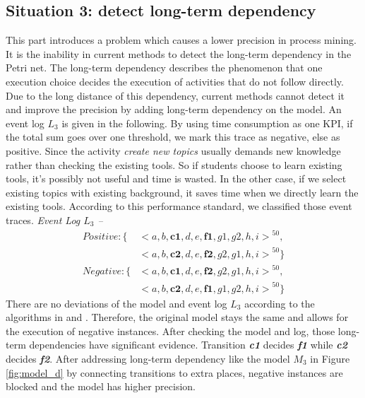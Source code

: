 \subsection{Situation 3: \small{detect long-term dependency}}
This part introduces a problem which causes a lower precision in process mining. It is the inability in current methods to detect the long-term dependency in the Petri net. The long-term dependency describes the phenomenon that one execution choice decides the execution of activities that do not follow directly. Due to the long distance of this dependency, current methods cannot detect it and improve the precision by adding long-term dependency on the model. 
An event log $L_3$ is given in the following. By using time consumption as one KPI, if the total sum goes over one threshold, we mark this trace as negative, else as positive. Since the activity \emph{create new topics} usually demands new knowledge rather than checking the existing tools. So if students choose to learn existing tools, it's possibly not useful and time is wasted. In the other case, if we select existing topics with existing background, it saves time when we directly learn the existing tools. According to this performance standard, we classified those event traces.
\emph{Event Log $L_3$ -- }
\begin{align*}
Positive:\{ & { <a,b,\textbf{c1},d,e,\textbf{f1},g1,g2, h,i>}^{50}, \\   &{<a,b,\textbf{c2},d,e,\textbf{f2},g2,g1, h,i>}^{50} \}  \\
Negative: \{ & {<a,b,\textbf{c1},d,e,\textbf{f2},g2,g1,h,i>}^{50}, \\
& {<a,b,\textbf{c2},d,e,\textbf{f1},g1,g2,h,i>}^{50}  \}
\end{align*}
There are no deviations of the model and event log $L_3$ according to the  algorithms in \cite{fahland2015model} and \cite{dees2017enhancing}. Therefore, the original model stays the same and allows for the execution of negative instances. After checking the model and log, those long-term dependencies have significant evidence. Transition \textbf{\emph{c1}} decides \textbf{\emph{f1}} while \textbf{\emph{c2}} decides \textbf{\emph{f2}}.  After addressing long-term dependency like the model $M_3$ in Figure \ref{fig:model_d} by connecting transitions to extra places, 
negative instances are blocked and the model has higher precision.

